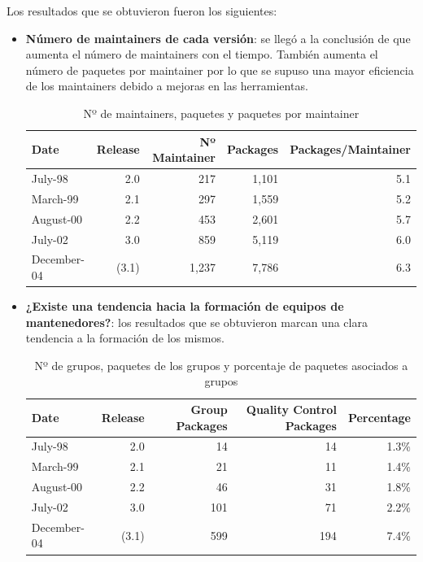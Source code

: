 \documentclass[a4paper, 12pt]{book}
\begin{document}
Los resultados que se obtuvieron fueron los siguientes:
\begin{itemize}
	\item \textbf {Número de maintainers de cada versión}: se llegó a la conclusión de que aumenta el número de maintainers con el tiempo. También aumenta el número de paquetes por maintainer por lo que se supuso una mayor eficiencia de los maintainers debido a mejoras en las herramientas.
	
	\begin{table}[]
		\begin{tabular}{|l|r|r|r|r|}
			\hline
			Date        & Release & Nº Maintainer & Packages & Packages/Maintainer \\ \hline
			July-98     & 2.0     & 217           & 1,101    & 5.1                 \\ \hline
			March-99    & 2.1     & 297           & 1,559    & 5.2                 \\ \hline
			August-00   & 2.2     & 453           & 2,601    & 5.7                 \\ \hline
			July-02     & 3.0     & 859           & 5,119    & 6.0                 \\ \hline
			December-04 & (3.1)   & 1,237          & 7,786    & 6.3                 \\ \hline
		\end{tabular}
		\caption{Nº de maintainers, paquetes y paquetes por maintainer}
	\end{table}
	
	\item \textbf {¿Existe una tendencia hacia la formación de equipos de 
	mantenedores?}: los resultados que se obtuvieron marcan una clara tendencia a la formación de los mismos.
	
	\begin{table}[h]
		\begin{tabular}{|l|r|r|r|r|}
			\hline
			Date        & Release & Group Packages & Quality Control Packages & Percentage \\ \hline
			July-98     & 2.0     & 14             & 14                       & 1.3\%      \\ \hline
			March-99    & 2.1     & 21             & 11                       & 1.4\%      \\ \hline
			August-00   & 2.2     & 46             & 31                       & 1.8\%      \\ \hline
			July-02     & 3.0     & 101            & 71                       & 2.2\%      \\ \hline
			December-04 & (3.1)   & 599            & 194                      & 7.4\%      \\ \hline
		\end{tabular}
		\caption{Nº de grupos, paquetes de los grupos y porcentaje de paquetes asociados a grupos}
	\end{table}
	

\end{itemize}
\end{document}
